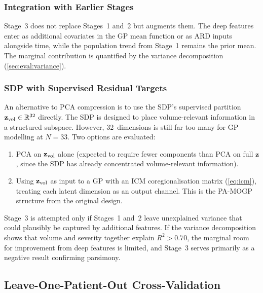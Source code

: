 \subsubsection{Integration with Earlier Stages}

Stage~3 does not replace Stages~1 and~2 but augments them. The deep features
enter as additional covariates in the GP mean function or as ARD inputs
alongside time, while the population trend from Stage~1 remains the prior
mean. The marginal contribution is quantified by the variance decomposition
(\cref{sec:eval:variance}).

\subsubsection{SDP with Supervised Residual Targets}

An alternative to PCA compression is to use the SDP's supervised partition
$\mathbf{z}_{\text{vol}} \in \mathbb{R}^{32}$ directly. The SDP is designed to place volume-relevant
information in a structured subspace. However, 32~dimensions is still far
too many for GP modelling at $N = 33$. Two options are evaluated:
\begin{enumerate}[leftmargin=*]
  \item PCA on $\mathbf{z}_{\text{vol}}$ alone (expected to require fewer components than PCA
    on full $\mathbf{z}$, since the SDP has already concentrated
    volume-relevant information).
  \item Using $\mathbf{z}_{\text{vol}}$ as input to a GP with an ICM coregionalisation matrix
    (\cref{eq:icm}), treating each latent dimension as an output channel.
    This is the PA-MOGP structure from the original design.
\end{enumerate}

\begin{remark}
  Stage~3 is attempted only if Stages~1 and~2 leave unexplained variance
  that could plausibly be captured by additional features. If the variance
  decomposition shows that volume and severity together explain $R^2 > 0.70$,
  the marginal room for improvement from deep features is limited, and
  Stage~3 serves primarily as a negative result confirming parsimony.
\end{remark}

\subsection{Leave-One-Patient-Out Cross-Validation}
\label{sec:growth:lopo}

